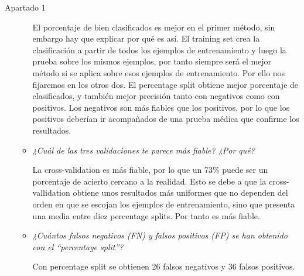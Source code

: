 \documentclass[11pt, a4paper, spanish, openright, twoside]{book}
\begin{document}
\begin{section}{Apartado 1}
\begin{itemize}
\begin{itemize}
			El porcentaje de bien clasificados es mejor en el primer método, sin embargo hay que explicar por qué es así. El training set crea la clasificación a partir de todos los ejemplos de entrenamiento  y luego la prueba sobre 
			los mismos ejemplos, por tanto siempre será el mejor método si se aplica sobre esos ejemplos de entrenamiento. Por ello nos fijaremos en los otros dos. El percentage split obtiene mejor porcentaje de clasificados, 
			y también mejor precisión tanto con negativos como con positivos. Los negativos son más fiables que los positivos, por lo que los positivos deberían ir acompañados de una prueba médica que confirme los resultados.
			
			\item  \textit{¿Cuál de las tres validaciones te parece más fiable? ¿Por qué?} 
			
			La cross-validation es más fiable, por lo que un 73\% puede ser un porcentaje de acierto cercano a la realidad. Esto se debe a que la cross-vallidation obtiene 
			unos resultados más uniformes que no dependen del orden en que se escojan los ejemplos de entrenamiento, sino que presenta una media entre diez percentage splits. Por tanto es más fiable.
			
			 \item \textit{¿Cuántos falsos negativos (FN) y falsos positivos (FP) se han obtenido con el “percentage split”?} 
			
			Con percentage split se obtienen 26 falsos negativos y 36 falsos positivos.
			
		\end{itemize}
	

	\end{itemize}
\end{section}
\end{document}
